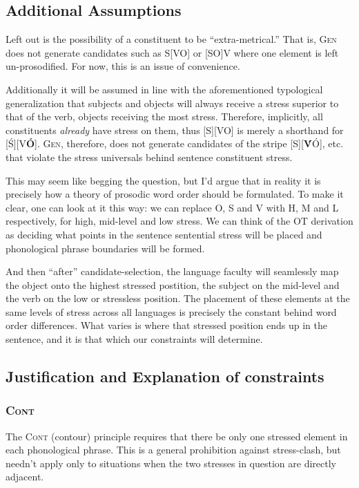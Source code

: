 \documentclass{article}
\newcommand{\cont}{\textsc{Cont}}
\begin{document}
\subsection{Additional Assumptions\label{assump}}

Left out is the possibility of a constituent to be ``extra-metrical.'' That is, \textsc{Gen} does not generate candidates such as S[VO] or [SO]V where one element is left un-prosodified. For now, this is an issue of convenience.

Additionally it will be assumed in line with the aforementioned typological generalization that subjects and objects will always receive a stress superior to that of the verb, objects receiving the most stress. Therefore, implicitly, all constituents \emph{already} have stress on them, thus [S][VO] is merely a shorthand for [{\'S}][V\textbf{\'O}]. \textsc{Gen}, therefore, does not generate candidates of the stripe [S][\textbf{\'V}\'O], etc. that violate the stress universals behind sentence constituent stress.

This may seem like begging the question, but I'd argue that in reality it is precisely how a theory of prosodic word order should be formulated. To make it clear, one can look at it this way: we can replace O, S and V with H, M and L respectively, for high, mid-level and low stress. We can think of the OT derivation as deciding what points in the sentence sentential stress will be placed and phonological phrase boundaries will be formed.

And then ``after'' candidate-selection, the language faculty will seamlessly map the object onto the highest stressed postition, the subject on the mid-level and the verb on the low or stressless position. The placement of these elements at the same levels of stress across all languages is precisely the constant behind word order differences. What varies is where that stressed position ends up in the sentence, and it is that which our constraints will determine.

\subsection{Justification and Explanation of constraints}

\subsubsection{\cont}

The {\cont} (contour) principle requires that there be only one stressed element in each phonological phrase. This is a general prohibition against stress-clash, but needn't apply only to situations when the two stresses in question are directly adjacent.
\end{document}
